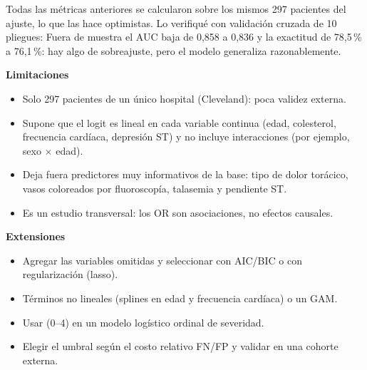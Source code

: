 
Todas las métricas anteriores se calcularon sobre los mismos 297 pacientes del ajuste, lo que las hace
optimistas. Lo verifiqué con validación cruzada de 10 pliegues:
Fuera de muestra el AUC baja de 0,858 a 0,836 y la exactitud de 78,5\,\% a 76,1\,\%: hay algo de
sobreajuste, pero el modelo generaliza razonablemente.

\noindent\textbf{Limitaciones}
\begin{itemize}[leftmargin=1.2em]
  \item[\color{cRed}\faMinusCircle] Solo 297 pacientes de un único hospital (Cleveland): poca validez externa.
  \item[\color{cRed}\faMinusCircle] Supone que el logit es lineal en cada variable continua (edad, colesterol,
  frecuencia cardíaca, depresión ST) y no incluye interacciones (por ejemplo, sexo $\times$ edad).
  \item[\color{cRed}\faMinusCircle] Deja fuera predictores muy informativos de la base: tipo de dolor torácico,
  vasos coloreados por fluoroscopía, talasemia y pendiente ST.
  \item[\color{cRed}\faMinusCircle] Es un estudio transversal: los OR son asociaciones, no efectos causales.
\end{itemize}
\noindent\textbf{Extensiones}
\begin{itemize}[leftmargin=1.2em]
  \item[\color{cTeal}\faPlusCircle] Agregar las variables omitidas y seleccionar con AIC/BIC o con
  regularización (lasso).
  \item[\color{cTeal}\faPlusCircle] Términos no lineales (splines en edad y frecuencia cardíaca) o un GAM.
  \item[\color{cTeal}\faPlusCircle] Usar  (0--4) en un modelo logístico ordinal de
  severidad.
  \item[\color{cTeal}\faPlusCircle] Elegir el umbral según el costo relativo FN/FP y validar en una cohorte externa.
\end{itemize}
